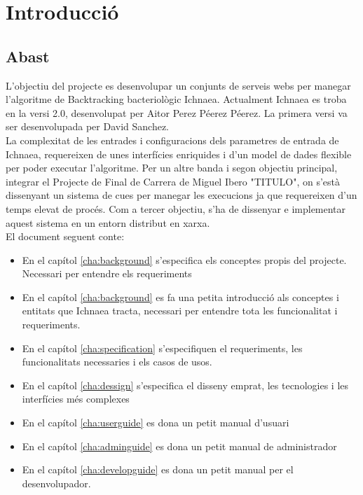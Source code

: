 \chapter*{Introducci\'{o}}

\section{Abast}
L'objectiu del projecte es desenvolupar un conjunts de serveis webs per manegar l'algoritme de Backtracking bacteriol\`{o}gic Ichnaea. Actualment Ichnaea es troba en la versi 2.0, desenvolupat per Aitor Perez P\'{e}erez P\'{e}erez. La primera versi va ser desenvolupada per David Sanchez. \\

La complexitat de les entrades i configuracions dels parametres de entrada de Ichnaea, requereixen de unes interf\'{i}cies enriquides i d'un model de dades flexible per poder executar l'algoritme. Per un altre banda i segon objectiu principal, integrar el Projecte de Final de Carrera de Miguel Ibero "TITULO", on s'est\`{a} dissenyant un sistema de cues per manegar les execucions ja que requereixen d'un temps elevat de proc\'{e}s. Com a tercer objectiu, s'ha de dissenyar e implementar aquest sistema en un entorn distribut en xarxa. \\

El document seguent conte:
\begin{itemize}
\item En el cap\'{i}tol \ref{cha:background} s'especifica els conceptes propis del projecte. Necessari per entendre els requeriments
\item En el cap\'{i}tol \ref{cha:background} es fa una petita introducci\'{o} als conceptes i entitats que Ichnaea tracta, necessari per entendre tota les funcionalitat i requeriments.
\item En el cap\'{i}tol \ref{cha:specification} s'especifiquen el requeriments, les funcionalitats necessaries i els casos de usos.
\item En el cap\'{i}tol \ref{cha:dessign} s'especifica el disseny emprat, les tecnologies i les interf\'{i}cies m\'e{s} complexes
\item En el cap\'{i}tol \ref{cha:userguide} es dona un petit manual d'usuari
\item En el cap\'{i}tol \ref{cha:adminguide} es dona un petit manual de administrador
\item En el cap\'{i}tol \ref{cha:developguide} es dona un petit manual per el desenvolupador.
\end{itemize}

